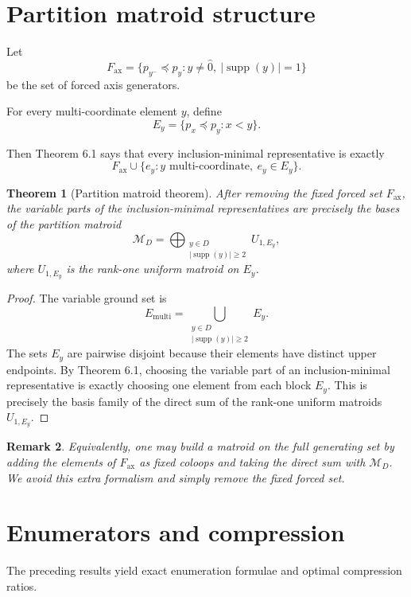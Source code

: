 \documentclass[11pt]{article}
\newtheorem{theorem}{Theorem}[section]
\newtheorem{remark}[theorem]{Remark}
\begin{document}
\section{Partition matroid structure}

Let
\[
F_{\mathrm{ax}}
=
\{p_{y^-}\preceq p_y:
y\ne\hat{0},\ |\operatorname{supp}(y)|=1\}
\]
be the set of forced axis generators.

For every multi-coordinate element $y$, define
\[
E_y=\{p_x\preceq p_y:x<y\}.
\]

Then Theorem 6.1 says that every inclusion-minimal representative is exactly
\[
F_{\mathrm{ax}}\cup \{e_y:y\text{ multi-coordinate},\ e_y\in E_y\}.
\]

\begin{theorem}[Partition matroid theorem]
After removing the fixed forced set $F_{\mathrm{ax}}$, the variable parts of the inclusion-minimal representatives are precisely the bases of the partition matroid
\[
\mathcal M_D=
\bigoplus_{\substack{y\in D\\ |\operatorname{supp}(y)|\ge2}}
U_{1,E_y},
\]
where $U_{1,E_y}$ is the rank-one uniform matroid on $E_y$.
\end{theorem}

\begin{proof}
The variable ground set is
\[
E_{\mathrm{multi}}
=
\bigcup_{\substack{y\in D\\ |\operatorname{supp}(y)|\ge2}} E_y.
\]
The sets $E_y$ are pairwise disjoint because their elements have distinct upper endpoints. By Theorem 6.1, choosing the variable part of an inclusion-minimal representative is exactly choosing one element from each block $E_y$. This is precisely the basis family of the direct sum of the rank-one uniform matroids $U_{1,E_y}$.
\end{proof}

\begin{remark}
Equivalently, one may build a matroid on the full generating set by adding the elements of $F_{\mathrm{ax}}$ as fixed coloops and taking the direct sum with $\mathcal M_D$. We avoid this extra formalism and simply remove the fixed forced set.
\end{remark}

\section{Enumerators and compression}

The preceding results yield exact enumeration formulae and optimal compression ratios.
\end{document}
